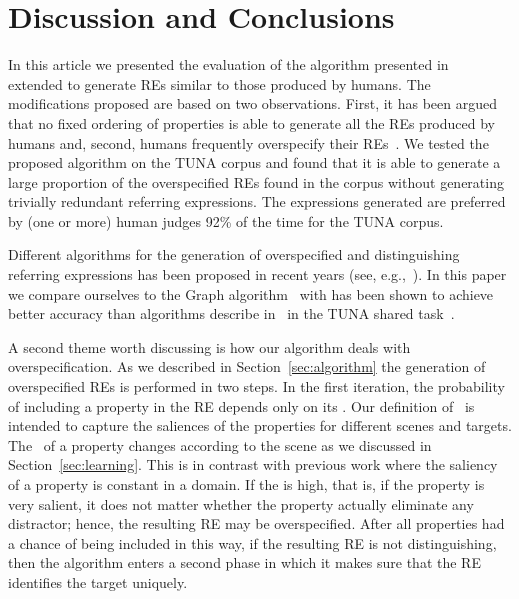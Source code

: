 \section{Discussion and Conclusions} 
\label{sec:discussion}

In this article we presented the evaluation of the algorithm presented in~\cite{arec2:2008:Areces} extended to generate REs similar to those produced by humans. The modifications proposed are based on two observations. First, it has been argued that no fixed ordering of properties is able to generate all the REs produced by humans and, second, humans frequently overspecify their REs~\cite{Engelhardt_Bailey_Ferreira_2006,Arts_Maes_Noordman_Jansen_2011}. 
We tested the proposed algorithm on the TUNA corpus and found that it is able to generate a large proportion of the overspecified REs found in the corpus without generating trivially redundant referring expressions. The expressions generated are preferred by (one or more) human judges 92\% of the time for the TUNA corpus. 


Different algorithms for the generation of overspecified and distinguishing referring expressions has been proposed in recent years 
(see, e.g.,~\cite{delucena-paraboni:2008:ENLG,ruud-emiel-mariet:2012:INLG2012}). In this paper we compare ourselves to the Graph algorithm~\cite{KrahmerGRAPH} with has been shown to achieve better accuracy than algorithms describe in~\cite{delucena-paraboni:2008:ENLG,ruud-emiel-mariet:2012:INLG2012} in the TUNA shared task~\cite{gatt-balz-kow:2008:ENLG}. 

A second theme worth discussing is how our algorithm deals with overspecification. As we described in Section~\ref{sec:algorithm} the generation of overspecified REs is performed in two steps. In the first iteration, the probability of including a property in the RE depends only on its \puse. Our definition of \puse\ is intended to capture the saliences of the properties for different scenes and targets. The \puse\ of a property changes according to the scene as we discussed in Section~\ref{sec:learning}. This is in contrast with previous work where the saliency of a property is constant in a domain. If the \puse is high, that is, if the property is very salient, it does not matter whether the property actually eliminate any distractor; hence, the resulting RE may be overspecified. After all properties had a chance of being included in this way, if the resulting RE is not distinguishing, then the algorithm enters a second phase in which it makes sure that the RE identifies the target uniquely.  

